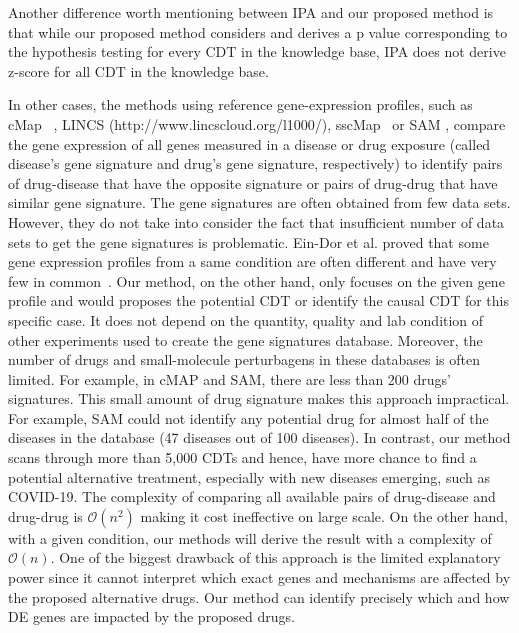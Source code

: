 Another  difference worth mentioning between IPA and our proposed method  is that while our proposed method  considers and derives a p value corresponding to the hypothesis testing for every CDT in the knowledge base, IPA does not derive z-score for all CDT in the knowledge base. %

In other cases, the methods using reference gene-expression profiles, such as cMap~\cite{lamb2007connectivity, lamb2006connectivity} , LINCS (http://www.lincscloud.org/l1000/), sscMap~\cite{zhang2009sscmap} or SAM \cite{sirota2011discovery}, compare the gene expression of all genes measured in a disease or drug exposure (called disease's gene signature and drug's gene signature, respectively) to identify pairs of drug-disease that have the opposite signature or pairs of drug-drug that have similar gene signature. The gene signatures are often obtained from few data sets. However, they do not take into consider the fact that insufficient number of data sets to get the gene signatures is problematic. Ein-Dor {et al.} proved  that some gene expression profiles from a same condition are often different and have very few in common~\cite{ein2005outcome}. Our method, on the other hand, only focuses on the given gene profile and would proposes the potential CDT or identify the causal CDT for this specific case. It does not depend on the quantity, quality and lab condition of other experiments used to create the gene signatures database. Moreover, the number of drugs and small-molecule perturbagens in these databases is often limited. For example, in cMAP and SAM, there are less than 200 drugs' signatures. This small amount of drug signature makes this approach impractical. For example, SAM could not identify any potential drug for almost half of the diseases in the database (47 diseases out of 100 diseases). In contrast, our method scans through more than 5,000 CDTs and hence, have more chance to find a potential alternative treatment, especially with new diseases emerging, such as COVID-19. The complexity of comparing all available pairs of drug-disease and drug-drug is $\mathcal{O}(n^2)$ making it cost ineffective on large scale. On the other hand, with a given condition, our methods will derive the result with a complexity of $\mathcal{O}(n)$. One of the biggest drawback of this approach is the limited explanatory power since it cannot interpret which exact genes and mechanisms are affected by the proposed alternative drugs. Our method can identify precisely which and how DE genes are impacted by the proposed drugs.

